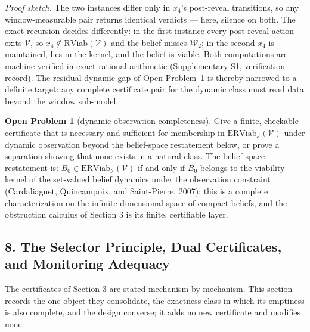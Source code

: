 \documentclass[10pt,twocolumn]{article}
\theoremstyle{definition}
\newtheorem{openproblem}{Open Problem}
\begin{document}
\emph{Proof sketch.} The two instances differ only in \(x_{4}\)'s post-reveal transitions,
so any window-measurable pair returns identical verdicts --- here, silence on both. The
exact recursion decides differently: in the first instance every post-reveal action exits
\(\mathcal{V}\), so \(x_{4} \notin \mathrm{RViab}(\mathcal{V})\) and the belief misses
\(\mathcal{W}_{2}\); in the second \(x_{4}\) is maintained, lies in the kernel, and the
belief is viable. Both computations are machine-verified in exact rational arithmetic
(Supplementary S1, verification record). The residual dynamic gap of
Open Problem~\ref{op:dynamic} is thereby narrowed to a definite target: any complete
certificate pair for the dynamic class must read data beyond the window sub-model.

\begin{openproblem}[dynamic-observation completeness]\label{op:dynamic}
Give a finite, checkable certificate that is necessary and sufficient for membership in \(\mathrm{ERViab}_{\mathcal{I}}(\mathcal{V})\) under dynamic observation beyond the belief-space restatement below, or prove a separation showing that none exists in a natural class. The belief-space restatement is: \(B_{0} \in \mathrm{ERViab}_{\mathcal{I}}(\mathcal{V})\) if and only if \(B_{0}\) belongs to the viability kernel of the set-valued belief dynamics under the observation constraint (Cardaliaguet, Quincampoix, and Saint-Pierre, 2007); this is a complete characterization on the infinite-dimensional space of compact beliefs, and the obstruction calculus of Section 3 is its finite, certifiable layer.
\end{openproblem}

\subsection{8. The Selector Principle, Dual Certificates, and Monitoring Adequacy}\label{selector-principle}

The certificates of Section 3 are stated mechanism by mechanism. This section records the one object they consolidate, the exactness class in which its emptiness is also complete, and the design converse; it adds no new certificate and modifies none.
\end{document}
